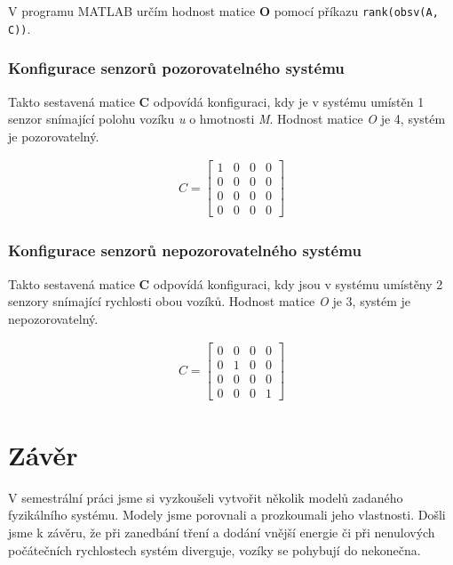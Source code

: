 V programu MATLAB určím hodnost matice \textbf{O} pomocí příkazu \texttt{rank(obsv(A, C))}.

\subsubsection{Konfigurace senzorů pozorovatelného systému}

Takto sestavená matice \textbf{C} odpovídá konfiguraci, kdy je v systému umístěn 1 senzor snímající polohu vozíku \textit{u} o hmotnosti \textit{M}. Hodnost matice \textit{O} je 4, systém je pozorovatelný.

\begin{align*}
    C = \begin{bmatrix} 1 & 0 & 0 & 0\\ 0 & 0 & 0 & 0\\ 0 & 0 & 0 & 0\\ 0 & 0 & 0 & 0 \end{bmatrix}
\end{align*}

\subsubsection{Konfigurace senzorů nepozorovatelného systému}

Takto sestavená matice \textbf{C} odpovídá konfiguraci, kdy jsou v systému umístěny 2 senzory snímající rychlosti obou vozíků. Hodnost matice \textit{O} je 3, systém je nepozorovatelný.

\begin{align*}
    C = \begin{bmatrix} 0 & 0 & 0 & 0\\ 0 & 1 & 0 & 0\\ 0 & 0 & 0 & 0\\ 0 & 0 & 0 & 1 \end{bmatrix}
\end{align*}

\section{Závěr}

V semestrální práci jsme si vyzkoušeli vytvořit několik modelů zadaného fyzikálního systému. Modely jsme porovnali a prozkoumali jeho vlastnosti. Došli jsme k závěru, že při zanedbání tření a dodání vnější energie či při nenulových počátečních rychlostech systém diverguje, vozíky se pohybují do nekonečna.
